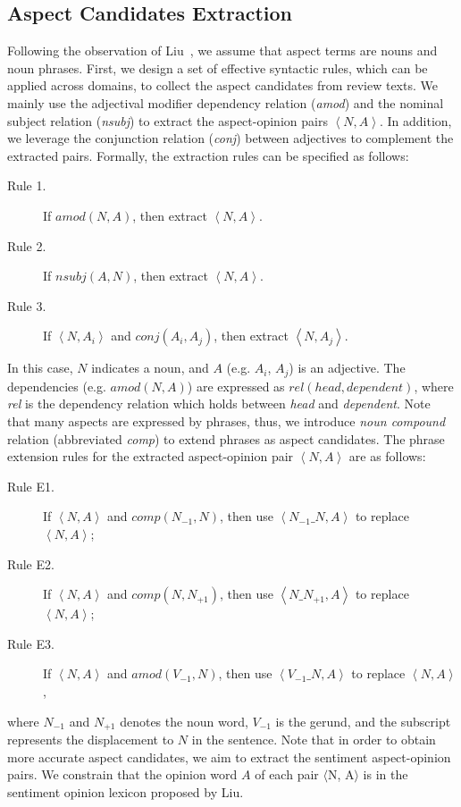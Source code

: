 \subsection{Aspect Candidates Extraction}
\label{sec:candidate}
Following the observation of Liu~\cite{hu2004mining, liu2015automated}, 
we assume that aspect terms are nouns and noun phrases.  
First, we design a set of effective syntactic rules, which can be applied across domains, to collect the aspect candidates from review texts.
We mainly use the adjectival modifier dependency relation (\emph{amod})
and the nominal subject relation (\emph{nsubj})
to extract the aspect-opinion pairs $\left\langle N, A \right\rangle$.
In addition, we leverage the conjunction relation (\emph{conj}) between 
adjectives to complement the extracted pairs. 
Formally, the extraction rules can be specified as follows:
\begin{description}
	\item [Rule 1.] If $amod(N, A)$, then extract $\left\langle N, A \right\rangle$.
	\item [Rule 2.]If $nsubj(A, N)$, then extract $\left\langle N, A \right\rangle$.
	\item [Rule 3.]If $\left\langle N, A_i \right\rangle$ and $conj(A_i, A_j)$, then extract $\left\langle N, A_j \right\rangle$.
\end{description}
In this case, $N$ indicates a noun, 
and $A$ (e.g. $A_i$, $A_j$) is an adjective. 
The dependencies (e.g. $amod(N, A)$) are expressed as $rel(head, dependent)$, where \textit{rel} is the dependency relation which holds
between \textit{head} and \textit{dependent}.
Note that many aspects are expressed by phrases,
thus, we introduce \emph{noun compound} relation 
(abbreviated \emph{comp}) to
extend phrases as aspect candidates.
The phrase extension rules for the extracted aspect-opinion pair $\left\langle N, A \right\rangle$ are as follows:
\begin{description}
	\item [Rule E1.] If $\left\langle N, A \right\rangle$ and $comp(N_{-1}, N)$, then use $\left\langle N_{-1}\_N, A \right\rangle$ to replace $\left\langle N, A \right\rangle$;
	\item [Rule E2.] If $\left\langle N, A \right\rangle$ and $comp(N, N_{+1})$, then use $\left\langle N\_N_{+1}, A \right\rangle$ to replace $\left\langle N, A \right\rangle$;
	\item [Rule E3.] If $\left\langle N, A \right\rangle$ and $amod(V_{-1}, N)$, then use $\left\langle V_{-1}\_N, A \right\rangle$ to replace $\left\langle N, A \right\rangle$,
\end{description}
where $N_{-1}$ and $N_{+1}$ denotes the noun word, $V_{-1}$ is the gerund, 
and the subscript represents the displacement to $N$ in the sentence.
Note that in order to obtain more accurate aspect candidates,
we aim to extract the sentiment aspect-opinion pairs. 
We constrain that the opinion word $A$ of each pair $\langle$N, A$\rangle$ is in the sentiment opinion lexicon proposed by Liu\cite{hu2004mining}.

